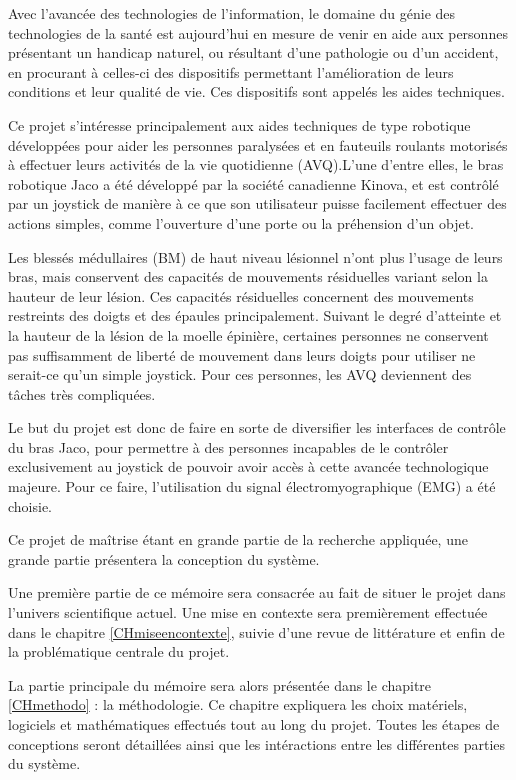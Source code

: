 \documentclass[letterpaper, twoside, 12pt, memoire, creativecommons, hyperref]{thETS}
\begin{document}
\begin{introduction}

Avec l’avancée des technologies de l’information, le domaine du génie des technologies de la santé est aujourd’hui en mesure de venir en aide aux personnes présentant un handicap naturel, ou résultant d’une pathologie ou d’un accident, en procurant à celles-ci des dispositifs permettant l’amélioration de leurs conditions et leur qualité de vie. Ces dispositifs sont appelés les aides techniques.

Ce projet s’intéresse principalement aux aides techniques de type robotique développées pour aider les personnes paralysées et en fauteuils roulants motorisés à effectuer leurs activités de la vie quotidienne (AVQ).L'une d'entre elles, le bras robotique Jaco a été développé par la société canadienne Kinova, et est contrôlé par un joystick de manière à ce que son utilisateur puisse facilement effectuer des actions simples, comme l’ouverture d’une porte ou la préhension d’un objet.

Les blessés médullaires (BM) de haut niveau lésionnel n’ont plus l’usage de leurs bras, mais conservent des capacités de mouvements résiduelles variant selon la hauteur de leur lésion. Ces capacités résiduelles concernent des mouvements restreints des doigts et des épaules principalement. Suivant le degré d’atteinte et la hauteur de la lésion de la moelle épinière, certaines personnes ne conservent pas suffisamment de liberté de mouvement dans leurs doigts pour utiliser ne serait-ce qu’un simple joystick. Pour ces personnes, les AVQ deviennent des tâches très compliquées.

Le but du projet est donc de faire en sorte de diversifier les interfaces de contrôle du bras Jaco, pour permettre à des personnes incapables de le contrôler exclusivement au joystick de pouvoir avoir accès à cette avancée technologique majeure. Pour ce faire, l'utilisation du signal électromyographique (EMG) a été choisie.

Ce projet de maîtrise étant en grande partie de la recherche appliquée, une grande partie présentera la conception du système. 

Une première partie de ce mémoire sera consacrée au fait de situer le projet dans l'univers scientifique actuel. Une mise en contexte sera premièrement effectuée dans le chapitre \ref{CHmiseencontexte}, suivie d'une revue de littérature et enfin de la problématique centrale du projet.

La partie principale du mémoire sera alors présentée dans le chapitre \ref{CHmethodo} : la méthodologie. Ce chapitre expliquera les choix matériels, logiciels et mathématiques effectués tout au long du projet. Toutes les étapes de conceptions seront détaillées ainsi que les intéractions entre les différentes parties du système. 


\end{introduction}
\end{document}
